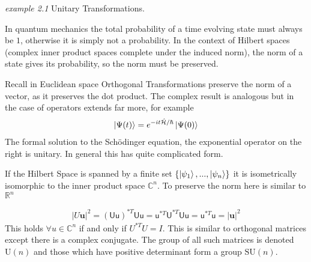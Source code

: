 \documentclass[twocolumn,floatfix,aps,prd,amsmath,amssymb]{revtex4}
\begin{document}
\begin{flushleft}\textit{example 2.1} Unitary Transformations. \end{flushleft}
In quantum mechanics the total probability of a time evolving state must always be $1$, otherwise it is simply not a probability. In the context of Hilbert spaces (complex inner product spaces complete under the induced norm), the norm of a state gives its probability, so the norm must be preserved.

Recall in Euclidean space Orthogonal Transformations preserve the norm of a vector, as it preserves the dot product. The complex result is analogous but in the case of operators extends far more, for example
\begin{align*}
\ket{\Psi(t)}=e^{-it\hat{\mathcal{H}} / \hbar}\ket{\Psi(0)}
\end{align*}
The formal solution to the Sch\"odinger equation, the exponential operator on the right is unitary. In general this has quite complicated form. 

If the Hilbert Space is spanned by a finite set $\{\ket{\psi_1},...,\ket{\psi_n} \}$ it is isometrically isomorphic to the inner product space $\mathbb{C}^n$. To preserve the norm here is similar to $\mathbb{R}^n$

\begin{align*}
|U\mathbf{u}|^2 =(\mathsf{Uu})^{*T}\mathsf{Uu} = \mathsf{u}^{*T}\mathsf{U}^{*T}\mathsf{Uu} = \mathsf{u}^{*T}\mathsf{u} = |\mathbf{u}|^2
\end{align*}
This holds $\forall u \in \mathbb{C}^n$ if and only if  $U^{*T}U=I$. This is similar to orthogonal matrices except there is a complex conjugate. The group of all such matrices is denoted $\mathrm{U}(n)$ and those which have positive determinant form a group $\mathrm{SU}(n)$.
\end{document}
